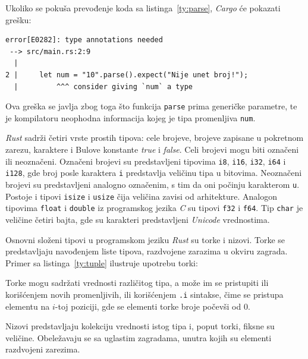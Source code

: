 \documentclass[12pt,oneside]{memoir}
\begin{document}


\noindent
Ukoliko se pokuša prevođenje koda sa listinga~\ref{ty:parse}, \emph{Cargo} će
pokazati grešku:

\begin{lstlisting}[language={}, style=text]
error[E0282]: type annotations needed
 --> src/main.rs:2:9
  |
2 |     let num = "10".parse().expect("Nije unet broj!");
  |         ^^^ consider giving `num` a type
\end{lstlisting}

\noindent
Ova greška se javlja zbog toga što funkcija \texttt{parse}
prima generičke parametre, te je kompilatoru neophodna informacija
kojeg je tipa promenljiva \texttt{num}.

\emph{Rust} sadrži četiri vrste prostih tipova: cele brojeve,
brojeve zapisane u pokretnom zarezu, karaktere i Bulove
konstante \emph{true} i \emph{false}. Celi brojevi mogu biti
označeni ili neoznačeni. Označeni brojevi su predstavljeni
tipovima \texttt{i8}, \texttt{i16}, \texttt{i32}, \texttt{i64} i
\texttt{i128}, gde broj posle karaktera \texttt{i} predstavlja
veličinu tipa u bitovima. Neoznačeni brojevi su predstavljeni
analogno označenim, s tim da oni počinju karakterom \texttt{u}.
Postoje i tipovi \texttt{isize} i \texttt{usize} čija veličina
zavisi od arhitekture.
Analogon tipovima \texttt{float} i \texttt{double} iz programskog
jezika \emph{C} su tipovi \texttt{f32} i \texttt{f64}. Tip
\texttt{char} je veličine četiri bajta, gde su karakteri predstavljeni
\emph{Unicode} vrednostima.

Osnovni složeni tipovi u programskom jeziku \emph{Rust} su torke
i nizovi. Torke se predstavljaju navođenjem liste tipova, razdvojene zarazima u okviru
zagrada. Primer sa listinga~\ref{ty:tuple} ilustruje upotrebu torki:



Torke mogu sadržati vrednosti različitog tipa, a može im se pristupiti
ili korišćenjem novih promenljivih, ili korišćenjem \texttt{.i} sintakse,
čime se pristupa elementu na $i$-toj poziciji, gde se elementi torke broje
počevši od $0$.

Nizovi predstavljaju kolekciju vrednosti istog tipa i, poput torki,
fiksne su veličine. Obeležavaju se sa uglastim zagradama, unutra kojih su elementi
razdvojeni zarezima.
\end{document}
